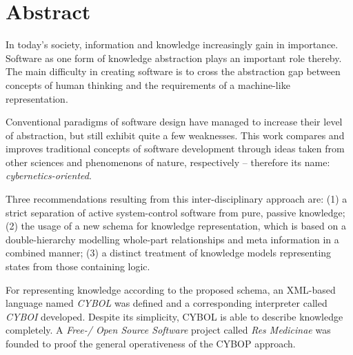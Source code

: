 %
%
%
%
%
%
%

\section{Abstract}
\label{abstract_heading}

In today's society, information and knowledge increasingly gain in importance.
Software as one form of knowledge abstraction plays an important role thereby.
The main difficulty in creating software is to cross the abstraction gap
between concepts of human thinking and the requirements of a machine-like
representation.

Conventional paradigms of software design have managed to increase their level
of abstraction, but still exhibit quite a few weaknesses. This work compares
and improves traditional concepts of software development through ideas taken
from other sciences and phenomenons of nature, respectively -- therefore its
name: \emph{cybernetics-oriented}.

Three recommendations resulting from this inter-disciplinary approach are:
(1) a strict separation of active system-control software from pure, passive
knowledge; (2) the usage of a new schema for knowledge representation, which is
based on a double-hierarchy modelling whole-part relationships and meta
information in a combined manner; (3) a distinct treatment of knowledge models
representing states from those containing logic.

For representing knowledge according to the proposed schema, an XML-based
language named \emph{CYBOL} was defined and a corresponding interpreter called
\emph{CYBOI} developed. Despite its simplicity, CYBOL is able to describe
knowledge completely. A \emph{Free-/ Open Source Software} project called
\emph{Res Medicinae} was founded to proof the general operativeness of the
CYBOP approach.

